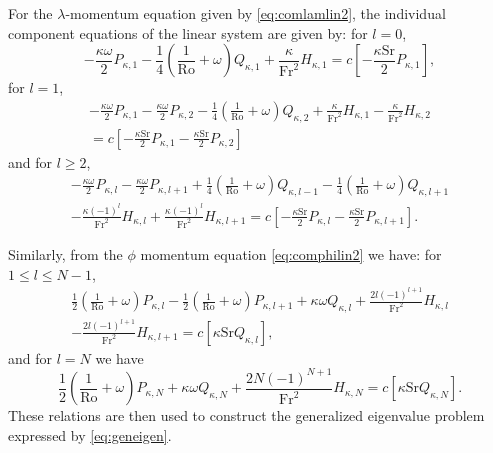 For the $\lambda$-momentum equation given by \eqref{eq:comlamlin2}, the individual component equations of the linear system are given by: for $l=0$,
\begin{equation}
-\frac{\kappa \omega}{2} P_{\kappa,1}-\frac{1}{4}\left(\frac{1}{\mathrm{Ro}}+\omega \right) Q_{\kappa,1} + \frac{\kappa}{\mathrm{Fr}^2} H_{\kappa,1} = c\left[-\frac{\kappa \mathrm{Sr}}{2} P_{\kappa,1} \right], \label{eq:comlaml0}
\end{equation}
for $l=1$,
\begin{multline}
-\frac{\kappa \omega}{2} P_{\kappa,1}-\frac{\kappa \omega}{2} P_{\kappa,2}-\frac{1}{4}\left(\frac{1}{\mathrm{Ro}}+\omega \right) Q_{\kappa,2} + \frac{\kappa}{\mathrm{Fr}^2} H_{\kappa,1}- \frac{\kappa}{\mathrm{Fr}^2} H_{\kappa,2} \\
= c\left[-\frac{\kappa \mathrm{Sr}}{2} P_{\kappa,1} -\frac{\kappa \mathrm{Sr}}{2} P_{\kappa,2}\right] \label{eq:comlaml1}
\end{multline}
and for $l\ge2$,
\begin{multline}
-\frac{\kappa \omega}{2} P_{\kappa,l}-\frac{\kappa \omega}{2} P_{\kappa,l+1}+\frac{1}{4}\left(\frac{1}{\mathrm{Ro}}+\omega \right) Q_{\kappa,l-1}-\frac{1}{4}\left(\frac{1}{\mathrm{Ro}}+\omega \right) Q_{\kappa,l+1} \\- \frac{\kappa(-1)^l}{\mathrm{Fr}^2} H_{\kappa,l}+ \frac{\kappa(-1)^l}{\mathrm{Fr}^2} H_{\kappa,l+1}
= c\left[-\frac{\kappa \mathrm{Sr}}{2} P_{\kappa,l} -\frac{\kappa \mathrm{Sr}}{2} P_{\kappa,l+1}\right]. \label{eq:comlaml2p}
\end{multline}

Similarly, from the $\phi$ momentum equation \eqref{eq:comphilin2} we have: for $1\le l \le N-1$,
\begin{multline}
\frac{1}{2}\left(\frac{1}{\mathrm{Ro}}+\omega \right)P_{\kappa,l}-\frac{1}{2}\left(\frac{1}{\mathrm{Ro}}+\omega \right)P_{\kappa,l+1}+\kappa \omega Q_{\kappa,l} + \frac{2l(-1)^{l+1}}{\mathrm{Fr}^2} H_{\kappa,l}\\- \frac{2l(-1)^{l+1}}{\mathrm{Fr}^2} H_{\kappa,l+1}=c\left[\kappa \mathrm{Sr} Q_{\kappa,l}\right], \label{eq:comphil1p}
\end{multline}
and for $l=N$ we have
\begin{equation}
\frac{1}{2}\left(\frac{1}{\mathrm{Ro}}+\omega \right)P_{\kappa,N}+\kappa \omega Q_{\kappa,N} + \frac{2N(-1)^{N+1}}{\mathrm{Fr}^2} H_{\kappa,N}=c\left[\kappa \mathrm{Sr} Q_{\kappa,N}\right]. \label{eq:comphilN}
\end{equation}
These relations are then used to construct the generalized eigenvalue problem expressed by \eqref{eq:geneigen}.